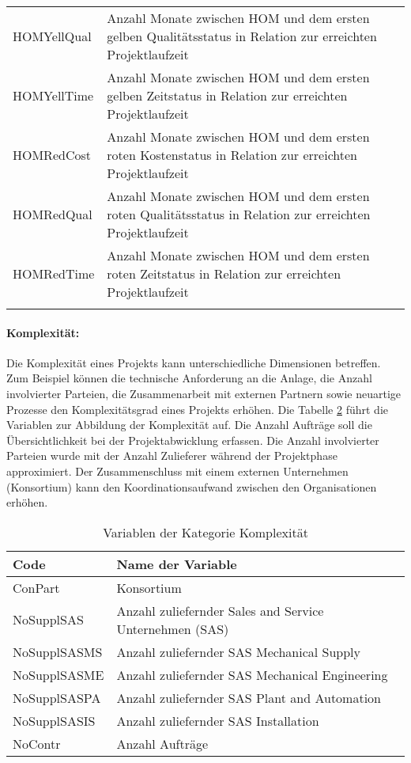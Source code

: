 \begin{longtable}[ht]{p{}p{}}
		HOMYellQual & Anzahl Monate zwischen HOM und dem ersten gelben Qualitätsstatus in Relation zur erreichten Projektlaufzeit \\
		HOMYellTime & Anzahl Monate zwischen HOM und dem ersten gelben Zeitstatus in Relation zur erreichten Projektlaufzeit \\
		HOMRedCost & Anzahl Monate zwischen HOM und dem ersten roten Kostenstatus in Relation zur erreichten Projektlaufzeit \\
		HOMRedQual & Anzahl Monate zwischen HOM und dem ersten roten Qualitätsstatus in Relation zur erreichten Projektlaufzeit \\
		HOMRedTime & Anzahl Monate zwischen HOM und dem ersten roten Zeitstatus in Relation zur erreichten Projektlaufzeit \\
		\bottomrule
	\label{tab:ffvar}%
\end{longtable}%
\paragraph{Komplexität:} Die Komplexität eines Projekts kann unterschiedliche Dimensionen betreffen. Zum Beispiel können die technische Anforderung an die Anlage, die Anzahl involvierter Parteien, die Zusammenarbeit mit externen Partnern sowie neuartige Prozesse den Komplexitätsgrad eines Projekts erhöhen. Die Tabelle \ref{tab:covar} führt die Variablen zur Abbildung der Komplexität auf. Die Anzahl Aufträge soll die Übersichtlichkeit bei der Projektabwicklung erfassen. Die Anzahl involvierter Parteien wurde mit der Anzahl Zulieferer während der Projektphase approximiert. Der Zusammenschluss mit einem externen Unternehmen (Konsortium) kann den Koordinationsaufwand zwischen den Organisationen erhöhen.
\begin{table}[H]
	\centering
	\caption{Variablen der Kategorie Komplexität}
	\begin{tabular}{ll}
			\toprule
		\textbf{Code} & \textbf{Name der Variable} \\ \midrule
		ConPart & Konsortium \\
		NoSupplSAS & Anzahl zuliefernder Sales and Service Unternehmen (SAS) \\
		NoSupplSASMS & Anzahl zuliefernder SAS Mechanical Supply \\
		NoSupplSASME & Anzahl zuliefernder SAS Mechanical Engineering \\
		NoSupplSASPA & Anzahl zuliefernder SAS Plant and Automation \\
		NoSupplSASIS & Anzahl zuliefernder SAS Installation \\
		NoContr & Anzahl Aufträge \\ 
		\bottomrule
	\end{tabular}%
	\label{tab:covar}%
\end{table}%
